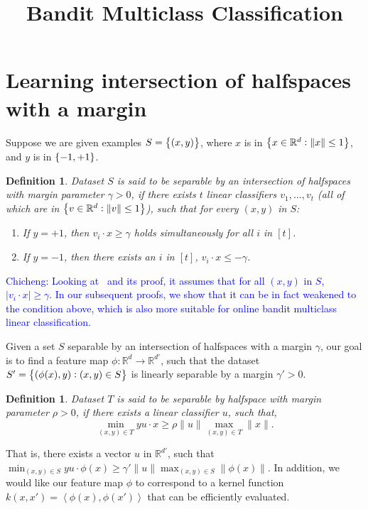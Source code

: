 \documentclass{article}
\title{Bandit Multiclass Classification}
\newcommand{\field}[1]{\mathbb{#1}}
\newcommand{\fR}{\field{R}}
\newcommand{\inner}[1]{ \left\langle {#1} \right\rangle }
\newcommand{\cz}[1]{\textcolor{blue}{Chicheng: #1}}
\newtheorem{definition}[theorem]{Definition}
\begin{document}

\maketitle

\section{Learning intersection of halfspaces with a margin}
Suppose we are given examples $S = \cbr{(x, y)}$, where $x$ is in $\cbr{x \in \fR^d: \| x \| \leq 1}$, and $y$ is in $\cbr{-1,+1}$.
\begin{definition}
Dataset $S$ is said to be separable by an intersection of halfspaces with margin parameter $\gamma > 0$, if there exists $t$ linear classifiers $v_1, \ldots, v_t$ (all of which are in $\cbr{v \in \fR^d: \| v \| \leq 1}$),
such that for every $(x,y)$ in $S$:
\begin{enumerate}
  \item If $y = +1$, then $v_i \cdot x \geq \gamma$ holds simultaneously for all $i$ in $[t]$.
  \item If $y = -1$, then there exists an $i$ in $[t]$, $v_i \cdot x \leq -\gamma$.
\end{enumerate}
\label{def:int-margin}
\end{definition}
\cz{Looking at~\cite{klivans2004learning} and its proof, it assumes that for all $(x,y)$ in $S$, $|v_i \cdot x| \geq \gamma$. In our subsequent proofs, we show that it can be in fact weakened to the condition above, which is also more suitable for online bandit multiclass linear classification.}

Given a set $S$ separable by an intersection of halfspaces with a margin $\gamma$, our goal is to find a feature map $\phi: \fR^d \to \fR^{d'}$, such that the dataset $S' = \cbr{(\phi(x), y): (x,y) \in S}$ is linearly separable by a margin $\gamma' > 0$.
\begin{definition}
Dataset $T$ is said to be separable by halfspace with margin parameter $\rho > 0$, if there exists a linear classifier $u$, such that,
\[ \min_{(x,y) \in T} y u \cdot x \geq \rho \|u\| \max_{(x,y) \in T} \| x \|. \]
\end{definition}

That is,
there exists a vector $u$ in $\fR^{d'}$, such that $\min_{(x,y) \in S} y u \cdot \phi(x) \geq \gamma' \|u\| \max_{(x,y) \in S} \| \phi(x) \|$.
In addition, we would like our feature map $\phi$ to correspond to a kernel function $k(x,x') = \inner{\phi(x), \phi(x')}$ that can be efficiently evaluated.
\end{document}
